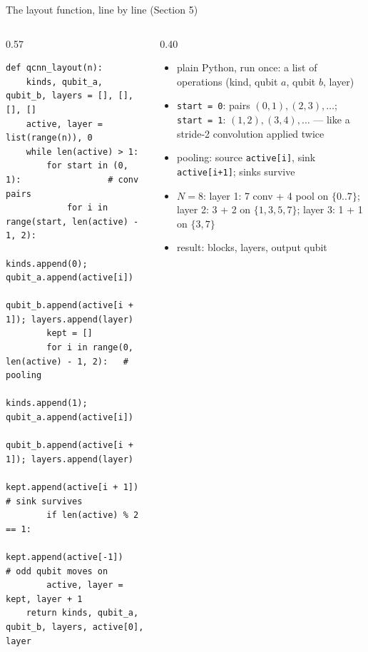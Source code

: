 \documentclass[aspectratio=169,11pt]{beamer}
\begin{document}
\begin{frame}[fragile,label=fLayout]{The layout function, line by line (Section 5)}
  \begin{columns}[T]
    \begin{column}{0.57\textwidth}
\begin{lstlisting}[basicstyle=\ttfamily\tiny]
def qcnn_layout(n):
    kinds, qubit_a, qubit_b, layers = [], [], [], []
    active, layer = list(range(n)), 0
    while len(active) > 1:
        for start in (0, 1):                 # conv pairs
            for i in range(start, len(active) - 1, 2):
                kinds.append(0); qubit_a.append(active[i])
                qubit_b.append(active[i + 1]); layers.append(layer)
        kept = []
        for i in range(0, len(active) - 1, 2):   # pooling
            kinds.append(1); qubit_a.append(active[i])
            qubit_b.append(active[i + 1]); layers.append(layer)
            kept.append(active[i + 1])       # sink survives
        if len(active) % 2 == 1:
            kept.append(active[-1])          # odd qubit moves on
        active, layer = kept, layer + 1
    return kinds, qubit_a, qubit_b, layers, active[0], layer
\end{lstlisting}
    \end{column}
    \begin{column}{0.40\textwidth}
      \scriptsize
      \begin{itemize}\itemsep1pt
        \item plain Python, run once: a list of operations (kind, qubit $a$, qubit $b$, layer)
        \item \texttt{start = 0}: pairs $(0,1), (2,3), \dots$; \texttt{start = 1}: $(1,2), (3,4), \dots$ --- like a stride-2 convolution applied twice
        \item pooling: source \texttt{active[i]}, sink \texttt{active[i+1]}; sinks survive
        \item $N = 8$: layer 1: 7 conv + 4 pool on $\{0..7\}$; layer 2: 3 + 2 on $\{1,3,5,7\}$; layer 3: 1 + 1 on $\{3,7\}$
        \item result: \numnblocks{} blocks, \numnlayers{} layers, output qubit \numoutqubit
      \end{itemize}
    \end{column}
  \end{columns}
\end{frame}
\end{document}
